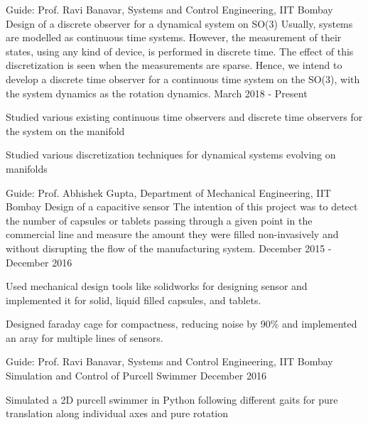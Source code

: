 

\begin{cventries}
	\cventry
		{Guide: Prof. Ravi Banavar, Systems and Control Engineering, IIT Bombay}
		{Design of a discrete observer for a dynamical system on SO(3)}
		{Usually, systems are modelled as continuous time systems. However, the measurement of their states, using any kind of device, is performed in discrete time. The effect of this discretization is seen when the measurements are sparse. Hence, we intend to develop a discrete time observer for a continuous time system on the SO(3), with the system dynamics as the rotation dynamics.}
		{March 2018 - Present}
		{
		\begin{cvitems}
			\item Studied various existing continuous time observers and discrete time observers for the system on the manifold
			\item Studied various discretization techniques for dynamical systems evolving on manifolds
		\end{cvitems}
		}

	\cventry
		{Guide: Prof. Abhishek Gupta, Department of Mechanical Engineering, IIT Bombay}
		{Design of a capacitive sensor}
		{The intention of this project was to detect the number of capsules or tablets passing through a given point in the commercial line and measure the amount they were filled non-invasively and without disrupting the flow of the manufacturing system.}
		{December 2015 - December 2016}
		{
		\begin{cvitems}
			\item Used mechanical design tools like solidworks for designing sensor and implemented it for solid, liquid filled capsules, and tablets.
			\item Designed faraday cage for compactness, reducing noise by 90\% and implemented an aray for multiple lines of sensors.
		\end{cvitems}
		}

	\cventry
		{Guide: Prof. Ravi Banavar, Systems and Control Engineering, IIT Bombay}
		{Simulation and Control of Purcell Swimmer}
		{}
		{December 2016}
		{
		\begin{cvitems}
			\item Simulated a 2D purcell swimmer in Python following different gaits for pure translation along individual axes and pure rotation
		\end{cvitems}
		}
\end{cventries}